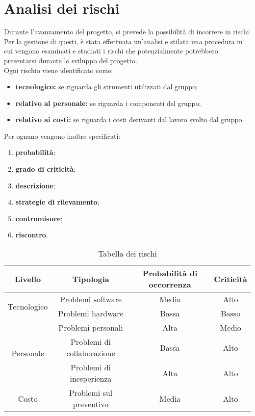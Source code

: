 \section{Analisi dei rischi}\label{sec:analisi_rischi}
Durante l'avanzamento del progetto, si prevede la possibilità di incorrere in rischi. Per la gestione di questi, è stata effettuata un'analisi e stilata una procedura in cui vengono esaminati e studiati i rischi che potenzialmente potrebbero presentarsi durante lo sviluppo del progetto. \\
Ogni rischio viene identificato come:
\begin{itemize}
\item \textbf{tecnologico:} se riguarda gli strumenti utilizzati dal gruppo;
\item \textbf{relativo al personale:} se riguarda i componenti del gruppo;
\item \textbf{relativo ai costi:} se riguarda i costi derivanti dal lavoro svolto dal gruppo.
\end{itemize}
Per ognuno vengono inoltre specificati:
\begin{enumerate}
	\item \textbf{probabilità};
	\item \textbf{grado di criticità};
	\item \textbf{descrizione};
	\item \textbf{strategie di rilevamento};
	\item \textbf{contromisure};
	\item \textbf{riscontro}.
\end{enumerate}

\begin{table}[H]
	\centering
	\begin{tabular}{|c|c|c|c|}
		\hline
		\textbf{Livello} &
		\textbf{Tipologia} &
		\textbf{Probabilità di occorrenza} &
		\textbf{Criticità}\\
		\hline
		\multirow{2}{*}{Tecnologico} & Problemi software & Media & Alto \\\cline{2-4}
									  & Problemi hardware & Bassa & Basso \\
		\hline
		\multirow{3}{*}{Personale} & Problemi personali & Alta & Medio \\\cline{2-4}
								   & Problemi di collaborazione & Bassa & Alto \\\cline{2-4}
								   & Problemi di inesperienza & Alta & Alto \\
		\hline
		Costo &  Problemi sul preventivo & Media & Alto \\
		\hline
	\end{tabular}
	\caption{Tabella dei rischi}
\end{table}

